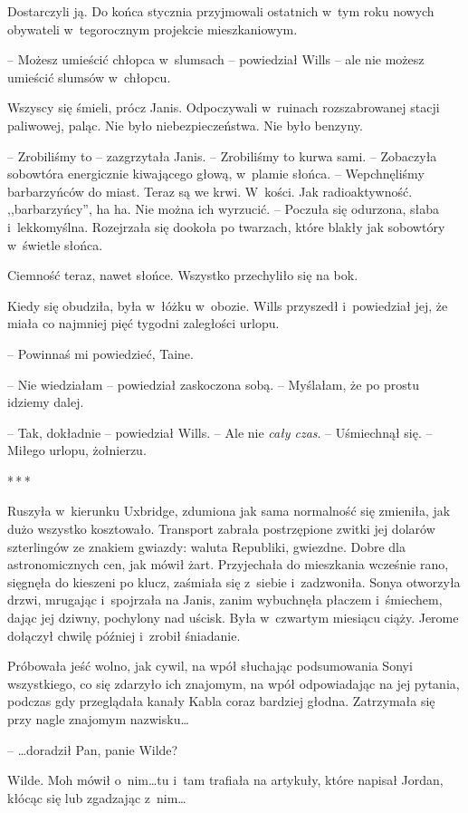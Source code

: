 \documentclass[oneside,polish,11pt,sfheadings]{mwbk}
\newcommand{\threeast}{\bigskip\par\centerline{*\,*\,*}\medskip\par}%
\begin{document}
Dostarczyli ją. Do końca stycznia przyjmowali ostatnich w~tym roku
nowych obywateli w~tegorocznym projekcie mieszkaniowym.

-- Możesz umieścić chłopca w~slumsach -- powiedział Wills -- ale nie możesz
umieścić slumsów w~chłopcu.

Wszyscy się śmieli, prócz Janis. Odpoczywali w~ruinach rozszabrowanej
stacji paliwowej, paląc. Nie było niebezpieczeństwa. Nie było benzyny.

-- Zrobiliśmy to -- zazgrzytała Janis. -- Zrobiliśmy to kurwa sami. -- Zobaczyła sobowtóra energicznie kiwającego głową, w~plamie słońca. -- Wepchnęliśmy barbarzyńców do miast. Teraz są we krwi. W~kości. Jak
radioaktywność. ,,barbarzyńcy'', ha ha. Nie można ich wyrzucić. -- Poczuła
się odurzona, słaba i~lekkomyślna. Rozejrzała się dookoła po twarzach,
które blakły jak sobowtóry w~świetle słońca.

Ciemność teraz, nawet słońce. Wszystko przechyliło się na bok.

Kiedy się obudziła, była w~łóżku w~obozie. Wills przyszedł i~powiedział
jej, że miała co najmniej pięć tygodni zaległości urlopu.

-- Powinnaś mi powiedzieć, Taine.

-- Nie wiedziałam -- powiedział zaskoczona sobą. -- Myślałam, że po prostu
idziemy dalej.

-- Tak, dokładnie -- powiedział Wills. -- Ale nie \emph{cały czas}. -- Uśmiechnął się. -- Miłego urlopu, żołnierzu.
  \threeast 

Ruszyła w~kierunku Uxbridge, zdumiona jak sama normalność się zmieniła,
jak dużo wszystko kosztowało. Transport zabrała postrzępione zwitki jej
dolarów szterlingów ze znakiem gwiazdy: waluta Republiki, gwiezdne.
Dobre dla astronomicznych cen, jak mówił żart. Przyjechała do mieszkania
wcześnie rano, sięgnęła do kieszeni po klucz, zaśmiała się z~siebie i~zadzwoniła. Sonya otworzyła drzwi, mrugając i~spojrzała na Janis, zanim
wybuchnęła płaczem i~śmiechem, dając jej dziwny, pochylony nad uścisk.
Była w~czwartym miesiącu ciąży. Jerome dołączył chwilę później i~zrobił
śniadanie.

Próbowała jeść wolno, jak cywil, na wpół słuchając podsumowania Sonyi
wszystkiego, co się zdarzyło ich znajomym, na wpół odpowiadając na jej
pytania, podczas gdy przeglądała kanały Kabla coraz bardziej głodna.
Zatrzymała się przy nagle znajomym nazwisku\ldots

-- \ldots doradził Pan, panie Wilde?

Wilde. Moh mówił o~nim\ldots tu i~tam trafiała na artykuły, które napisał
Jordan, kłócąc się lub zgadzając z~nim\ldots
\end{document}
